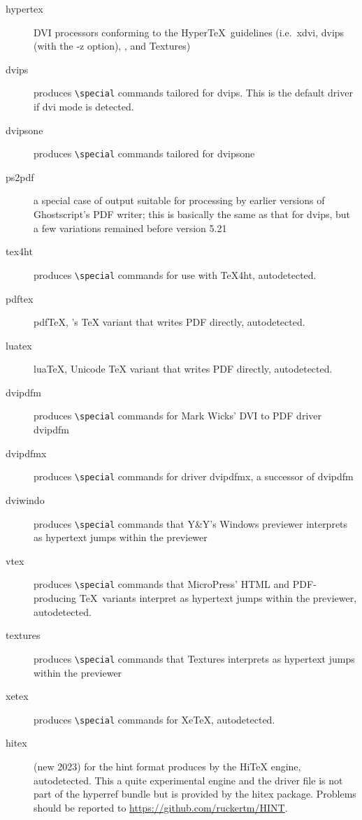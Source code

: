 \documentclass{article}
\newcommand*{\xpackage}[1]{\textsf{#1}}
\begin{document}
\begin{description}
\item[hypertex] DVI processors conforming to the Hyper\TeX\ guidelines (i.e.\ \textsf{xdvi}, \textsf{dvips} (with
the \textsf{-z} option), \textsf{}, and \textsf{Textures})
\item[dvips] produces \verb|\special| commands tailored for \textsf{dvips}. This is the default driver if dvi mode is
detected.
\item[dvipsone] produces \verb|\special| commands tailored for \textsf{dvipsone}
\item[ps2pdf] a special case of output suitable for processing by earlier versions of Ghost\-script's
PDF writer; this is basically the same as that for \textsf{dvips}, but a few variations remained before version 5.21
\item[tex4ht] produces \verb|\special| commands for use with \textsf{\TeX4ht}, autodetected.
\item[pdftex] pdf\TeX, 's \TeX{} variant that writes PDF directly, autodetected.
\item[luatex] lua\TeX, Unicode \TeX{} variant that writes PDF directly, autodetected.
\item[dvipdfm] produces \verb|\special| commands for Mark Wicks' DVI to PDF driver \textsf{dvipdfm}
\item[dvipdfmx] produces \verb|\special| commands for driver
     \textsf{dvipdfmx}, a successor of \textsf{dvipdfm}
\item[dviwindo] produces \verb|\special| commands that Y\&Y's Windows previewer interprets as hypertext jumps within the previewer
\item[vtex] produces \verb|\special| commands that MicroPress' HTML and
     PDF-producing \TeX\ variants interpret as hypertext jumps within the
     previewer, autodetected.
\item[textures] produces \verb|\special| commands that \textsf{Textures} interprets as hypertext jumps within the previewer
\item[xetex] produces \verb|\special| commands for Xe\TeX{}, autodetected.
\item[hitex] (new 2023) for the hint format produces by the Hi\TeX{} engine, autodetected. This a quite experimental
engine and the driver file is not part of the \xpackage{hyperref} bundle but is provided by
the \xpackage{hitex} package. Problems should be reported to \url{https://github.com/ruckertm/HINT}.
\end{description}
\end{document}
